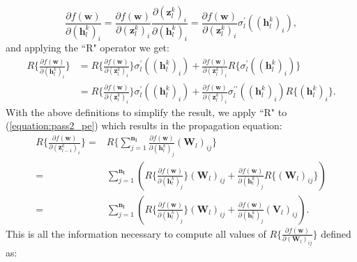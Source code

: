 \documentclass[letterpaper,12pt,titlepage,oneside,final]{book}
\begin{document}
	\begin{equation}
	\frac{\partial{f(\mathbf{w})}}{\partial{(\mathbf{h}_{l}^{k})_{i}}} = \frac{\partial{f(\mathbf{w})}}{\partial{(\mathbf{z}^{k}_{l})_{i}}}\frac{\partial{(\mathbf{z}^{k}_{l})_{i}}}{\partial{(\mathbf{h}^{k}_{l})_{i}}} = \frac{\partial{f(\mathbf{w})}}{\partial{(\mathbf{z}^{k}_{l})_{i}}}\sigma_{l}^{\prime}((\mathbf{h}_{l}^{k})_{i}), 
	\end{equation}
	and applying the ``R" operator we get:
	\begin{equation}
	\begin{split}
	R\{\frac{\partial{f(\mathbf{w})}}{\partial{(\mathbf{h}_{l}^{k})_{i}}}\} & = R\{\frac{\partial{f(\mathbf{w})}}{\partial{(\mathbf{z}^{k}_{l})_{i}}}\}\sigma_{l}^{\prime}((\mathbf{h}_{l}^{k})_{i}) + \frac{\partial{f(\mathbf{w})}}{\partial{(\mathbf{z}^{k}_{l})_{i}}}R\{\sigma_{l}^{\prime}((\mathbf{h}_{l}^{k})_{i}) \} \\
	& = R\{\frac{\partial{f(\mathbf{w})}}{\partial{(\mathbf{z}^{k}_{l})_{i}}}\}\sigma_{l}^{\prime}((\mathbf{h}_{l}^{k})_{i}) + \frac{\partial{f(\mathbf{w})}}{\partial{(\mathbf{z}^{k}_{l})_{i}}}\sigma_{l}^{\prime \prime}((\mathbf{h}_{l}^{k})_{i})R\{(\mathbf{h}_{l}^{k})_{i}\}.
	\label{equation:rdh}
	\end{split}
	\end{equation}
	With the above definitions to simplify the result, we apply ``R" to (\ref{equation:pass2_pe}) which results in the propagation equation:
	\begin{equation}
	\begin{split}
	R\{\frac{\partial{f(\mathbf{w})}}{\partial{(\mathbf{z}^{k}_{l-1})_{i}}}\} =
	& R\{\sum_{j=1}^{\mathbf{n_{l}}}{\frac{\partial{f(\mathbf{w})}}{\partial{(\mathbf{h}_{l}^{k})_{j}}}}(\mathbf{W}_{l})_{ij}\} \\
	=& \sum_{j=1}^{\mathbf{n_{l}}}{(R\{\frac{\partial{f(\mathbf{w})}}{\partial{(\mathbf{h}_{l}^{k})_{j}}}\}(\mathbf{W}_{l})_{ij} + \frac{\partial{f(\mathbf{w})}}{\partial{(\mathbf{h}_{l}^{k})_{j}}}R\{(\mathbf{W}_{l})_{ij}\})}\\
	=& \sum_{j=1}^{\mathbf{n_{l}}}{(R\{\frac{\partial{f(\mathbf{w})}}{\partial{(\mathbf{h}_{l}^{k})_{j}}}\}(\mathbf{W}_{l})_{ij} + \frac{\partial{f(\mathbf{w})}}{\partial{(\mathbf{h}_{l}^{k})_{j}}}(\mathbf{V}_{l})_{ij})}.
	\label{equation:pass4_pe}
	\end{split}
	\end{equation}
	This is all the information necessary to compute all values of $R\{\frac{\partial{f(\mathbf{w})}}{\partial{(\mathbf{W}_{l})_{ij}}}\}$ defined as:
\end{document}
